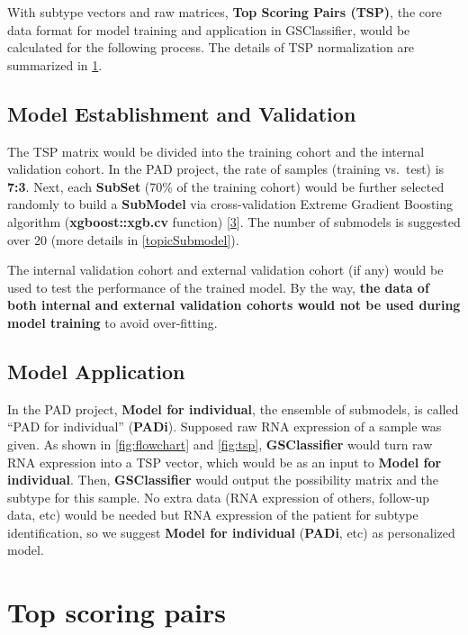 \documentclass[
  12pt,
]{book}
\begin{document}
With subtype vectors and raw matrices, \textbf{Top Scoring Pairs (TSP)}, the core data format for model training and application in GSClassifier, would be calculated for the following process. The details of TSP normalization are summarized in \ref{topicTSP}.

\hypertarget{model-establishment-and-validation}{%
\subsection{Model Establishment and Validation}\label{model-establishment-and-validation}}

The TSP matrix would be divided into the training cohort and the internal validation cohort. In the PAD project, the rate of samples (training vs.~test) is \textbf{7:3}. Next, each \textbf{SubSet} (70\% of the training cohort) would be further selected randomly to build a \textbf{SubModel} via cross-validation Extreme Gradient Boosting algorithm (\textbf{xgboost::xgb.cv} function) {[}\protect\hyperlink{ref-RN345}{3}{]}. The number of submodels is suggested over 20 (more details in \ref{topicSubmodel}).

The internal validation cohort and external validation cohort (if any) would be used to test the performance of the trained model. By the way, \textbf{the data of both internal and external validation cohorts would not be used during model training} to avoid over-fitting.

\hypertarget{model-application}{%
\subsection{Model Application}\label{model-application}}

In the PAD project, \textbf{Model for individual}, the ensemble of submodels, is called ``PAD for individual'' (\textbf{PADi}). Supposed raw RNA expression of a sample was given. As shown in \ref{fig:flowchart} and \ref{fig:tsp}, \textbf{GSClassifier} would turn raw RNA expression into a TSP vector, which would be as an input to \textbf{Model for individual}. Then, \textbf{GSClassifier} would output the possibility matrix and the subtype for this sample. No extra data (RNA expression of others, follow-up data, etc) would be needed but RNA expression of the patient for subtype identification, so we suggest \textbf{Model for individual} (\textbf{PADi}, etc) as personalized model.

\hypertarget{topicTSP}{%
\section{Top scoring pairs}\label{topicTSP}}
\end{document}
